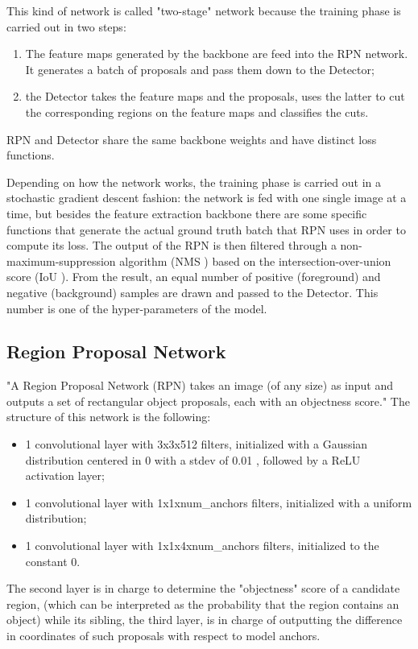 \documentclass[a4paper,10pt]{report}
\begin{document}
This kind of network is called "two-stage" network because the training phase is carried out in two steps:
\begin{enumerate}
    \item The feature maps generated by the backbone are feed into the RPN network. It generates a batch of proposals and pass them down to the Detector;
    \item the Detector takes the feature maps and the proposals, uses the latter to cut the corresponding regions on the feature maps and classifies the cuts.
\end{enumerate}
RPN and Detector share the same backbone weights and have distinct loss functions.

Depending on how the network works, the training phase is carried out in a stochastic gradient descent fashion: the network is fed with one single image at a time, but besides the feature extraction backbone there are some specific functions that generate the actual ground truth batch that RPN uses in order to compute its loss. The output of the RPN is then filtered through a non-maximum-suppression algorithm (NMS \cite{nms}) based on the intersection-over-union score (IoU \cite{iou}). From the result, an equal number of positive (foreground) and negative (background) samples are drawn and passed to the Detector. This number is one of the hyper-parameters of the model.

\subsection{Region Proposal Network}\label{subsec:rpn-net}
"A Region Proposal Network (RPN) takes an image (of any size) as input and outputs a set of rectangular object proposals, each with an objectness score." \cite{faster-rcnn}
The structure of this network is the following:
\begin{itemize}
    \item 1 convolutional layer with 3x3x512 filters, initialized with a Gaussian distribution centered in 0 with a stdev of 0.01  \cite{faster-rcnn}, followed by a ReLU activation layer;
    \item 1 convolutional layer with 1x1xnum\_anchors filters, initialized with a uniform distribution;
    \item 1 convolutional layer with 1x1x4xnum\_anchors filters, initialized to the constant 0.
\end{itemize}

The second layer is in charge to determine the "objectness" score of a candidate region, (which can be interpreted as the probability that the region contains an object) while its sibling, the third layer, is in charge of outputting the difference in coordinates of such proposals with respect to model anchors.
\end{document}

